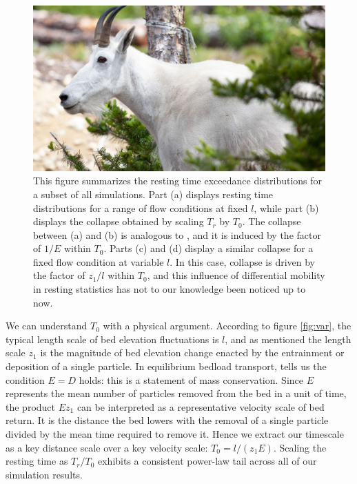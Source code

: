 \documentclass[draft]{agujournal2018}
\begin{document}
\begin{figure}[t!] %
  \includegraphics[width=\linewidth,keepaspectratio]{rectdummy}
  \caption{This figure summarizes the resting time exceedance distributions for a subset of all simulations. Part (a) displays resting time distributions for a range of flow conditions at fixed $l$, while part (b) displays the collapse obtained by scaling $T_r$ by $T_0$. The collapse between (a) and (b) is analogous to \citet{Martin2014}, and it is induced by the factor of $1/E$ within $T_0$. Parts (c) and (d) display a similar collapse for a fixed flow condition at variable $l$. In this case, collapse is driven by the factor of $z_1/l$ within $T_0$, and this influence of differential mobility in resting statistics has not to our knowledge been noticed up to now.}
\vspace{-1.0cm}
  \label{fig:collapse}
\end{figure}

We can understand $T_0$ with a physical argument.
According to figure \ref{fig:var}, the typical length scale of bed elevation fluctuations is $l$, and as mentioned the length scale $z_1$ is the magnitude of bed elevation change enacted by the entrainment or deposition of a single particle.  
In equilibrium bedload transport, \citet{Einstein1950} tells us the condition $E=D$ holds: this is a statement of mass conservation. 
Since $E$ represents the mean number of particles removed from the bed in a unit of time, the product $E z_1$ can be interpreted as a representative velocity scale of bed return. 
It is the distance the bed lowers with the removal of a single particle divided by the mean time required to remove it.
Hence we extract our timescale as a key distance scale over a key velocity scale: $T_0 = l/(z_1 E).$ 
Scaling the resting time as $T_r/T_0$ exhibits a consistent power-law tail across all of our simulation results. 
\end{document}
